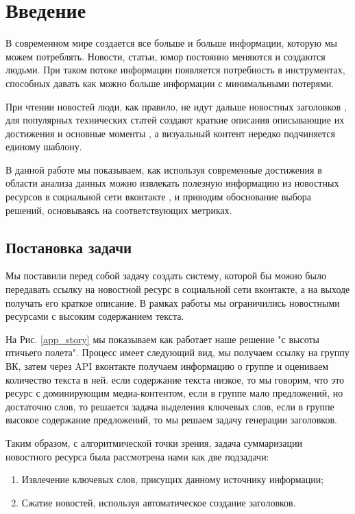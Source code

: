 \documentclass[aps,%
12pt,%
final,%
oneside,
onecolumn,%
musixtex, %
superscriptaddress,%
centertags]{article} %
\begin{document}
\section{Введение}
В современном мире создается все больше и больше информации, которую мы можем потреблять.
Новости, статьи, юмор постоянно меняются и создаются людьми. При таком потоке информации
появляется потребность в инструментах, способных давать как можно больше информации
с минимальными потерями.

При чтении новостей люди, как правило, не идут дальше новостных заголовков \cite{jaysondemers2016},
для популярных технических статей создают краткие описания описывающие их достижения
и основные моменты \cite{tldr_arxiv2019, articleessence2019}, а визуальный контент нередко подчиняется единому шаблону.

В данной работе мы показываем, как используя современные достижения в области анализа
данных можно извлекать полезную информацию из новостных ресурсов в социальной сети вконтакте \cite{vk2019},
и приводим обоснование выбора решений, основываясь на соответствующих метриках.

\subsection{Постановка задачи}
Мы поставили перед собой задачу создать систему, которой бы можно было передавать ссылку на новостной ресурс в социальной сети вконтакте, а на выходе получать его краткое описание. В рамках работы мы ограничились новостными ресурсами с высоким содержанием текста.

На Рис. \ref{app_story} мы показываем как работает наше решение "с высоты птичьего полета". Процесс имеет следующий вид, мы получаем ссылку на группу ВК, затем через API вконтакте получаем информацию о группе и оцениваем количество текста в ней. если содержание текста низкое, то мы говорим, что это ресурс с доминирующим медиа-контентом, если в группе мало предложений, но достаточно слов, то решается задача выделения ключевых слов, если в группе высокое содержание предложений, то мы решаем задачу генерации заголовков.

Таким образом, с алгоритмической точки зрения, задача суммаризации новостного ресурса была рассмотрена нами как две подзадачи:
\begin{enumerate}
  \item Извлечение ключевых слов, присущих данному источнику информации;
  \item Сжатие новостей, используя автоматическое создание заголовков.
\end{enumerate}
\end{document}
